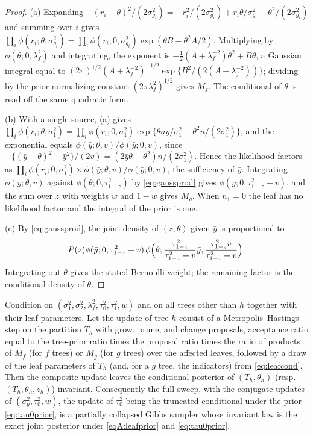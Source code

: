 \begin{proof}
(a) Expanding $-(r_i-\theta)^2/(2\sigma^2_{g_i})=-r_i^2/(2\sigma^2_{g_i})+r_i\theta/\sigma^2_{g_i}-\theta^2/(2\sigma^2_{g_i})$ and summing over $i$ gives
$\prod_i\phi(r_i;\theta,\sigma^2_{g_i})=\prod_i\phi(r_i;0,\sigma^2_{g_i})\exp(\theta B-\theta^2A/2)$. Multiplying by $\phi(\theta;0,\lambda_f^2)$ and integrating, the exponent is $-\tfrac12(A+\lambda_f^{-2})\theta^2+B\theta$, a Gaussian integral equal to $(2\pi)^{1/2}(A+\lambda_f^{-2})^{-1/2}\exp\{B^2/(2(A+\lambda_f^{-2}))\}$; dividing by the prior normalizing constant $(2\pi\lambda_f^2)^{1/2}$ gives $M_f$. The conditional of $\theta$ is read off the same quadratic form.

(b) With a single source, (a) gives $\prod_i\phi(r_i;\theta,\sigma_1^2)=\prod_i\phi(r_i;0,\sigma_1^2)\exp\{\theta n\bar y/\sigma_1^2-\theta^2n/(2\sigma_1^2)\}$, and the exponential equals $\phi(\bar y;\theta,v)/\phi(\bar y;0,v)$, since $-\{(\bar y-\theta)^2-\bar y^2\}/(2v)=(2\bar y\theta-\theta^2)n/(2\sigma_1^2)$. Hence the likelihood factors as $\prod_i\phi(r_i;0,\sigma_1^2)\times\phi(\bar y;\theta,v)/\phi(\bar y;0,v)$, the sufficiency of $\bar y$. Integrating $\phi(\bar y;\theta,v)$ against $\phi(\theta;0,\tau_{1-z}^2)$ by \eqref{eq:gaussprod} gives $\phi(\bar y;0,\tau_{1-z}^2+v)$, and the sum over $z$ with weights $w$ and $1-w$ gives $M_g$. When $n_1=0$ the leaf has no likelihood factor and the integral of the prior is one.

(c) By \eqref{eq:gaussprod}, the joint density of $(z,\theta)$ given $\bar y$ is proportional to
\[
P(z)\phi(\bar y;0,\tau_{1-z}^2+v)\,
\phi\Bigl(\theta;\frac{\tau_{1-z}^2}{\tau_{1-z}^2+v}\bar y,\frac{\tau_{1-z}^2v}{\tau_{1-z}^2+v}\Bigr).
\]
Integrating out $\theta$ gives the stated Bernoulli weight; the remaining factor is the conditional density of $\theta$.
\end{proof}

\begin{propA}\label{prop:exact}
Condition on $(\sigma_1^2,\sigma_2^2,\lambda_f^2,\tau_0^2,\tau_1^2,w)$ and on all trees other than $h$ together with their leaf parameters. Let the update of tree $h$ consist of a Metropolis--Hastings step on the partition $T_h$ with grow, prune, and change proposals, acceptance ratio equal to the tree-prior ratio times the proposal ratio times the ratio of products of $M_f$ (for $f$ trees) or $M_g$ (for $g$ trees) over the affected leaves, followed by a draw of the leaf parameters of $T_h$ (and, for a $g$ tree, the indicators) from \eqref{eq:leafcond}. Then the composite update leaves the conditional posterior of $(T_h,\theta_h)$ (resp.\ $(T_h,\theta_h,z_h)$) invariant. Consequently the full sweep, with the conjugate updates of $(\sigma_g^2,\tau_0^2,w)$, the update of $\tau_0^2$ being the truncated conditional under the prior \eqref{eq:tau0prior}, is a partially collapsed Gibbs sampler whose invariant law is the exact joint posterior under \eqref{eqA:leafprior} and \eqref{eq:tau0prior}.
\end{propA}


